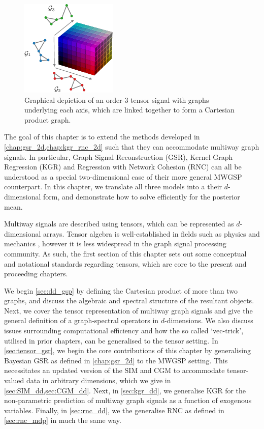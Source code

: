 \begin{figure}[b] 
    \begin{center}
        \includegraphics[width=0.45\linewidth]{Figures/colored_tensor.pdf}
    \end{center}
   \caption[Graphical depiction of an order-3 tensor]{Graphical depiction of an order-3 tensor signal with graphs underlying each axis, which are linked together to form a Cartesian product graph.} 
    \label{fig:coloured_tensor}
\end{figure}   

The goal of this chapter is to extend the methods developed in \cref{chap:gsr_2d,chap:kgr_rnc_2d} such that they can accommodate multiway graph signals. In particular, Graph Signal Reconstruction (GSR), Kernel Graph Regression (KGR) and Regression with Network Cohesion (RNC) can all be understood as a special two-dimensional case of their more general MWGSP counterpart. In this chapter, we translate all three models into a their $d$-dimensional form, and demonstrate how to solve efficiently for the posterior mean.  


Multiway signals are described using tensors, which can be represented as $d$-dimensional arrays. Tensor algebra is well-established in fields such as physics and mechanics \citep{Renteln2013}, however it is less widespread in the graph signal processing community. As such, the first section of this chapter sets out some conceptual and notational standards regarding tensors, which are core to the present and proceeding chapters. 


We begin \cref{sec:dd_gsp} by defining the Cartesian product of more than two graphs, and discuss the algebraic and spectral structure of the resultant objects. Next, we cover the tensor representation of multiway graph signals and give the general definition of a graph-spectral operators in $d$-dimensions. We also discuss issues surrounding computational efficiency and how the so called `vec-trick', utilised in prior chapters, can be generalised to the tensor setting. In \cref{sec:tensor_gsr}, we begin the core contributions of this chapter by generalising Bayesian GSR as defined in \cref{chap:gsr_2d} to the MWGSP setting. This necessitates an updated version of the SIM and CGM to accommodate tensor-valued data in arbitrary dimensions, which we give in \cref{sec:SIM_dd,sec:CGM_dd}. Next, in \cref{sec:kgr_dd}, we generalise KGR for the non-parametric prediction of multiway graph signals as a function of exogenous variables. Finally, in \cref{sec:rnc_dd}, we the generalise RNC as defined in \cref{sec:rnc_mdp} in much the same way.  




